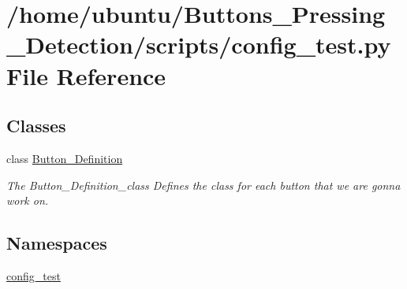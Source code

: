 \hypertarget{a00017}{}\section{/home/ubuntu/\+Buttons\+\_\+\+Pressing\+\_\+\+Detection/scripts/config\+\_\+test.py File Reference}
\label{a00017}
\subsection*{Classes}
\begin{DoxyCompactItemize}
\item 
class \hyperlink{a00053}{Button\+\_\+\+Definition}
\begin{DoxyCompactList}\small\item\em The Button\+\_\+\+Definition\+\_\+class Defines the class for each button that we are gonna work on. \end{DoxyCompactList}\end{DoxyCompactItemize}
\subsection*{Namespaces}
\begin{DoxyCompactItemize}
\item 
 \hyperlink{a00025}{config\+\_\+test}
\end{DoxyCompactItemize}
